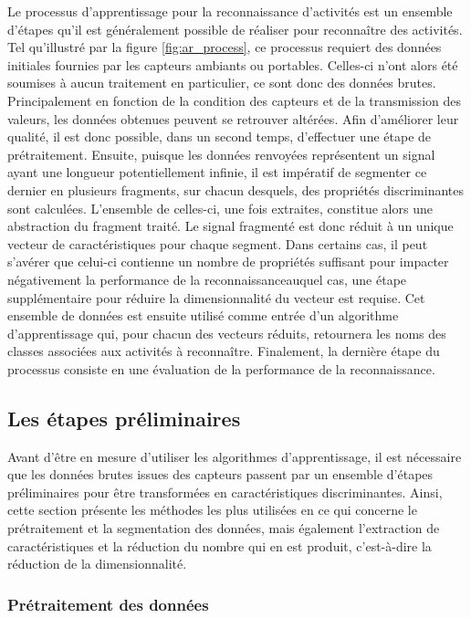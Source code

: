 Le processus d'apprentissage pour la reconnaissance d'activités est un ensemble d'étapes qu'il est généralement possible de réaliser pour reconnaître des activités. Tel qu'illustré par la figure \ref{fig:ar_process}, ce processus requiert des données initiales fournies par les capteurs ambiants ou portables. Celles-ci n'ont alors été soumises à aucun traitement en particulier, ce sont donc des données brutes. Principalement en fonction de la condition des capteurs et de la transmission des valeurs, les données obtenues peuvent se retrouver altérées. Afin d'améliorer leur qualité, il est donc possible, dans un second temps, d'effectuer une étape de prétraitement. Ensuite, puisque les données renvoyées représentent un signal ayant une longueur potentiellement infinie, il est impératif de segmenter ce dernier en plusieurs fragments, sur chacun desquels, des propriétés discriminantes sont calculées. L'ensemble de celles-ci, une fois extraites, constitue alors une abstraction du fragment traité. Le signal fragmenté est donc réduit à un unique vecteur de caractéristiques pour chaque segment. Dans certains cas, il peut s'avérer que celui-ci contienne un nombre de propriétés suffisant pour impacter négativement la performance de la reconnaissance\textemdash auquel cas, une étape supplémentaire pour réduire la dimensionnalité du vecteur est requise. Cet ensemble de données est ensuite utilisé comme entrée d'un algorithme d'apprentissage qui, pour chacun des vecteurs réduits, retournera les noms des classes associées aux activités à reconnaître. Finalement, la dernière étape du processus consiste en une évaluation de la performance de la reconnaissance.

\subsection{Les étapes préliminaires}
\label{sec:prel_steps}

Avant d'être en mesure d'utiliser les algorithmes d'apprentissage, il est nécessaire que les données brutes issues des capteurs passent par un ensemble d'étapes préliminaires pour être transformées en caractéristiques discriminantes. Ainsi, cette section présente les méthodes les plus utilisées en ce qui concerne le prétraitement et la segmentation des données, mais également l'extraction de caractéristiques et la réduction du nombre qui en est produit, c'est-à-dire la réduction de la dimensionnalité.

\subsubsection{Prétraitement des données}

